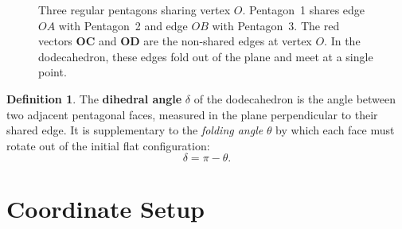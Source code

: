 \documentclass[11pt,a4paper]{article}
\newcommand{\vv}[1]{\mathbf{#1}}
\theoremstyle{definition}
\newtheorem{definition}{Definition}
\begin{document}
\begin{figure}[ht]
\caption{Three regular pentagons sharing vertex $O$. Pentagon~1 shares edge $OA$
with Pentagon~2 and edge $OB$ with Pentagon~3. The red vectors $\vv{OC}$ and
$\vv{OD}$ are the non-shared edges at vertex $O$. In the dodecahedron, these
edges fold out of the plane and meet at a single point.}
\label{fig:pentagons}
\end{figure}

\begin{definition}
The \textbf{dihedral angle} $\delta$ of the dodecahedron is the angle between two
adjacent pentagonal faces, measured in the plane perpendicular to their shared edge.
It is supplementary to the \emph{folding angle} $\theta$ by which each face must
rotate out of the initial flat configuration:
\[
  \delta = \pi - \theta.
\]
\end{definition}

\section{Coordinate Setup}
\label{sec:coords}
\end{document}
